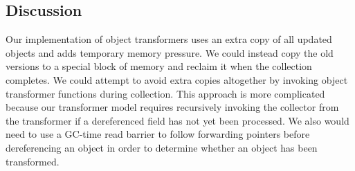 \documentclass[9pt]{sigplanconf}
\begin{document}

\subsection{Discussion}

Our implementation of object transformers uses an extra copy of all updated objects and adds
temporary memory pressure.
We  could instead copy the old versions to a special block of memory
and reclaim it when the collection completes. We could attempt to avoid
extra copies altogether by invoking object 
transformer functions during collection.  This approach is more
complicated because our transformer model requires recursively invoking the collector
from the transformer if a dereferenced field has not yet been
processed.  We also would need to use a  GC-time read barrier
to follow forwarding pointers before dereferencing an object in order
to determine whether an object has been transformed.

\end{document}
